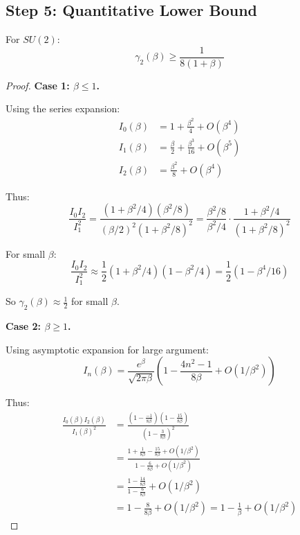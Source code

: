 \subsection{Step 5: Quantitative Lower Bound}

\begin{theorem}
\label{thm:su2-explicit}
For $SU(2)$:
\begin{equation}
\gamma_2(\beta) \geq \frac{1}{8(1 + \beta)}
\end{equation}
\end{theorem}

\begin{proof}
\textbf{Case 1: $\beta \leq 1$.}

Using the series expansion:
\begin{align}
I_0(\beta) &= 1 + \frac{\beta^2}{4} + O(\beta^4) \\
I_1(\beta) &= \frac{\beta}{2} + \frac{\beta^3}{16} + O(\beta^5) \\
I_2(\beta) &= \frac{\beta^2}{8} + O(\beta^4)
\end{align}

Thus:
\begin{equation}
\frac{I_0 I_2}{I_1^2} = \frac{(1 + \beta^2/4)(\beta^2/8)}{(\beta/2)^2(1 + \beta^2/8)^2} 
= \frac{\beta^2/8}{\beta^2/4} \cdot \frac{1 + \beta^2/4}{(1 + \beta^2/8)^2}
\end{equation}

For small $\beta$:
\begin{equation}
\frac{I_0 I_2}{I_1^2} \approx \frac{1}{2}(1 + \beta^2/4)(1 - \beta^2/4) = \frac{1}{2}(1 - \beta^4/16)
\end{equation}

So $\gamma_2(\beta) \approx \frac{1}{2}$ for small $\beta$.

\textbf{Case 2: $\beta \geq 1$.}

Using asymptotic expansion for large argument:
\begin{equation}
I_n(\beta) = \frac{e^\beta}{\sqrt{2\pi\beta}} \left(1 - \frac{4n^2-1}{8\beta} + O(1/\beta^2)\right)
\end{equation}

Thus:
\begin{align}
\frac{I_0(\beta) I_2(\beta)}{I_1(\beta)^2} &= \frac{(1 - \frac{-1}{8\beta})(1 - \frac{15}{8\beta})}{(1 - \frac{3}{8\beta})^2} \\
&= \frac{1 + \frac{1}{8\beta} - \frac{15}{8\beta} + O(1/\beta^2)}{1 - \frac{6}{8\beta} + O(1/\beta^2)} \\
&= \frac{1 - \frac{14}{8\beta}}{1 - \frac{6}{8\beta}} + O(1/\beta^2) \\
&= 1 - \frac{8}{8\beta} + O(1/\beta^2) = 1 - \frac{1}{\beta} + O(1/\beta^2)
\end{align}


\end{proof}
